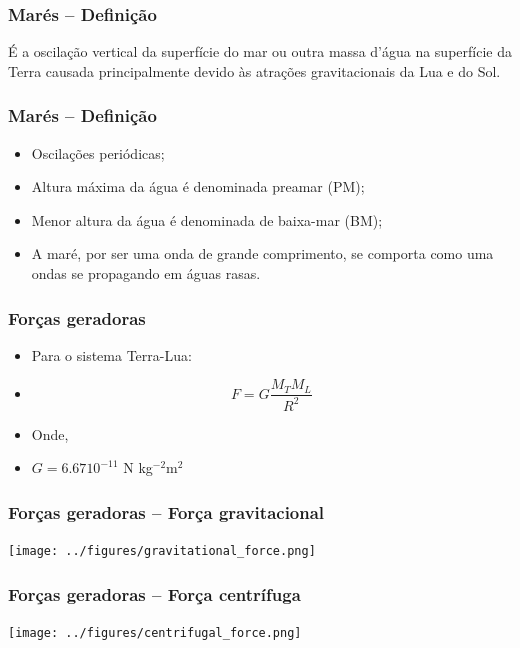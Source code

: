 \begin{frame}
  \frametitle{Marés -- Definição}
  \begin{center}
  \begin{block}{}
      É a oscilação vertical da superfície do mar ou outra massa d'água
      na superfície da Terra causada principalmente devido às atrações
      gravitacionais da Lua e do Sol.
  \end{block}
  \end{center}
\end{frame}

\begin{frame}
  \frametitle{Marés -- Definição}
    \begin{itemize}[<+-| alert@+>]
      \item Oscilações periódicas;
      \item Altura máxima da água é denominada preamar (PM);
      \item Menor altura da água é denominada de baixa-mar (BM);
      \item A maré, por ser uma onda de grande comprimento, se comporta como
            uma ondas se propagando em águas rasas.
    \end{itemize}
\end{frame}

\begin{frame}
  \frametitle{Forças geradoras}
    \begin{itemize}[<+-| alert@+>]
      \item Para o sistema Terra-Lua:
      \item \[F = G\frac{M_TM_L}{R^2}\]
      \item Onde,
      \item $G = 6.67 10^{-11}$ N kg$^{-2}$m$^{2}$
    \end{itemize}
\end{frame}


\begin{frame}
  \frametitle{Forças geradoras -- Força gravitacional}
  \begin{center}
    \texttt{[image: ../figures/gravitational\_force.png]}
  \end{center}
\end{frame}


\begin{frame}
  \frametitle{Forças geradoras -- Força centrífuga}
  \begin{center}
    \texttt{[image: ../figures/centrifugal\_force.png]}
  \end{center}
\end{frame}

